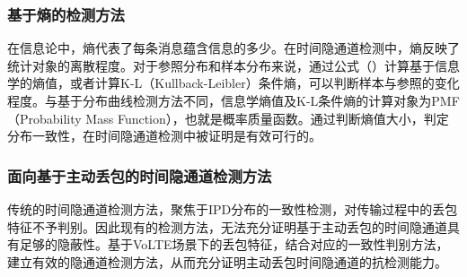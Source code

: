 
\subsubsection{基于熵的检测方法}
在信息论中，熵代表了每条消息蕴含信息的多少。在时间隐通道检测中，熵反映了统计对象的离散程度。对于参照分布和样本分布来说，通过公式（）计算基于信息学的熵值，或者计算K-L（Kullback-Leibler）条件熵，可以判断样本与参照的变化程度。与基于分布曲线检测方法不同，信息学熵值及K-L条件熵的计算对象为PMF（Probability Mass Function），也就是概率质量函数。通过判断熵值大小，判定分布一致性，在时间隐通道检测中被证明是有效可行的。

\subsubsection{面向基于主动丢包的时间隐通道检测方法}
传统的时间隐通道检测方法，聚焦于IPD分布的一致性检测，对传输过程中的丢包特征不予判别。因此现有的检测方法，无法充分证明基于主动丢包的时间隐通道具有足够的隐蔽性。基于VoLTE场景下的丢包特征，结合对应的一致性判别方法，建立有效的隐通道检测方法，从而充分证明主动丢包时间隐通道的抗检测能力。
